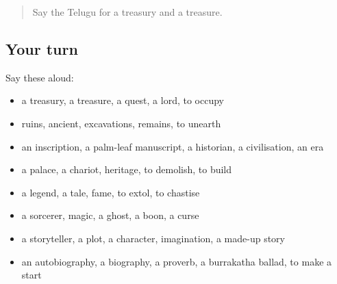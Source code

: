 \begin{quote}
Say the Telugu for a treasury and a treasure.
\end{quote}

\subsection*{Your turn}
Say these aloud:

\begin{itemize}
\raggedright
  \item a treasury, a treasure, a quest, a lord, to occupy
  \item ruins, ancient, excavations, remains, to unearth
  \item an inscription, a palm-leaf manuscript, a historian, a civilisation, an era
  \item a palace, a chariot, heritage, to demolish, to build
  \item a legend, a tale, fame, to extol, to chastise
  \item a sorcerer, magic, a ghost, a boon, a curse
  \item a storyteller, a plot, a character, imagination, a made-up story
  \item an autobiography, a biography, a proverb, a burrakatha ballad, to make a start
\end{itemize}

